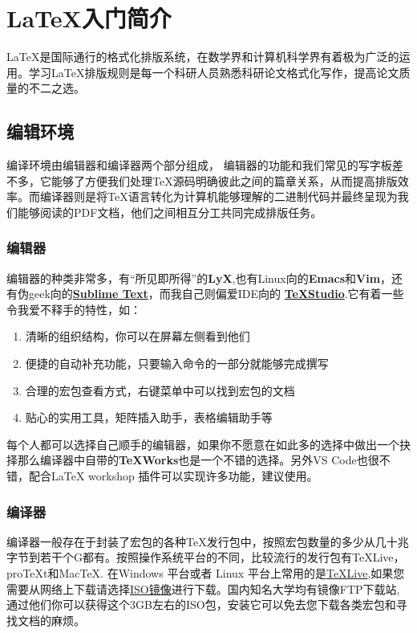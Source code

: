 \section{\LaTeX 入门简介}
\LaTeX 是国际通行的格式化排版系统，在数学界和计算机科学界有着极为广泛的运用。学习\LaTeX 排版规则是每一个科研人员熟悉科研论文格式化写作，提高论文质量的不二之选。
\subsection{编辑环境}
编译环境由编辑器和编译器两个部分组成， 编辑器的功能和我们常见的写字板差不多，它能够了方便我们处理\TeX 源码明确彼此之间的篇章关系，从而提高排版效率。而编译器则是将\TeX 语言转化为计算机能够理解的二进制代码并最终呈现为我们能够阅读的PDF文档，他们之间相互分工共同完成排版任务。
\subsubsection{编辑器}
编辑器的种类非常多，有“所见即所得”的\textbf{LyX},也有Linux向的\textbf{Emacs}和\textbf{Vim}，还有伪geek向的\href{http://www.sublimetext.com/}{\textbf{Sublime Text}}，而我自己则偏爱IDE向的
\href{http://texstudio.sourceforge.net/}{\textbf{\TeX Studio}}.它有着一些令我爱不释手的特性，如：
\begin{enumerate}
\item 清晰的组织结构，你可以在屏幕左侧看到他们
\item 便捷的自动补充功能，只要输入命令的一部分就能够完成撰写
\item 合理的宏包查看方式，右键菜单中可以找到宏包的文档
\item 贴心的实用工具，矩阵插入助手，表格编辑助手等
\end{enumerate}

每个人都可以选择自己顺手的编辑器，如果你不愿意在如此多的选择中做出一个抉择那么编译器中自带的\textbf{\TeX Works}也是一个不错的选择。另外VS Code也很不错，配合LaTeX workshop 插件可以实现许多功能，建议使用。
\subsubsection{编译器}
编译器一般存在于封装了宏包的各种\TeX 发行包中，按照宏包数量的多少从几十兆字节到若干个G都有。按照操作系统平台的不同，比较流行的发行包有\TeX Live，pro\TeX t和Mac\TeX . 在Windows 平台或者 Linux 平台上常用的是\href{https://www.tug.org/texlive/}{\TeX Live},如果您需要从网络上下载请选择\href{https://www.tug.org/texlive/acquire-iso.html}{ISO镜像}进行下载。国内知名大学均有镜像FTP下载站,通过他们你可以获得这个3GB左右的ISO包，安装它可以免去您下载各类宏包和寻找文档的麻烦。
